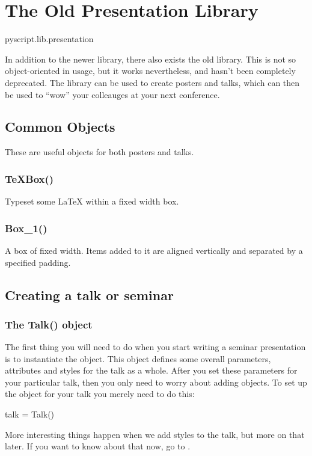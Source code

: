 
\chapter{The Old Presentation Library}

\begin{python}
pyscript.lib.presentation
\end{python}

In addition to the newer  library, there also
exists the old  library.  This is not so
object-oriented in usage, but it works nevertheless, and hasn't been
completely deprecated.  The  library can be used to create
posters and talks, which can then be used to ``wow'' your colleauges at your
next conference.

\section{Common Objects}

These are useful objects for both posters and talks.

\subsection{TeXBox()}

Typeset some \LaTeX{} within a fixed width box.

\subsection{Box\_1()}

A box of fixed width.  Items added to it are aligned vertically and
separated by a specified padding.

\section{Creating a talk or seminar}

\subsection{The Talk() object}

The first thing you will need to do when you start writing a seminar
presentation is to instantiate the  object.  This object defines
some overall parameters, attributes and styles for the talk as a whole.
After you set these parameters for your particular talk, then you only need
to worry about adding  objects.  To set up the 
object for your talk you merely need to do this:
\begin{python}
talk = Talk()
\end{python}
More interesting things happen when we add styles to the talk, but more on
that later.  If you want to know about that now, go to .


